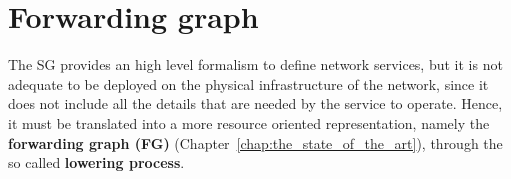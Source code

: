 \section{Forwarding graph}
\label{sec:forwarding_graph}

The SG provides an high level formalism to define network services, but it is not adequate to be deployed on the physical infrastructure of the network, since it does not include all the details that are needed by the service to operate.
Hence, it must be translated into a more resource oriented representation, namely the \textbf{forwarding graph (FG)} (Chapter~\ref{chap:the_state_of_the_art}), through the so called \textbf{lowering process}.

